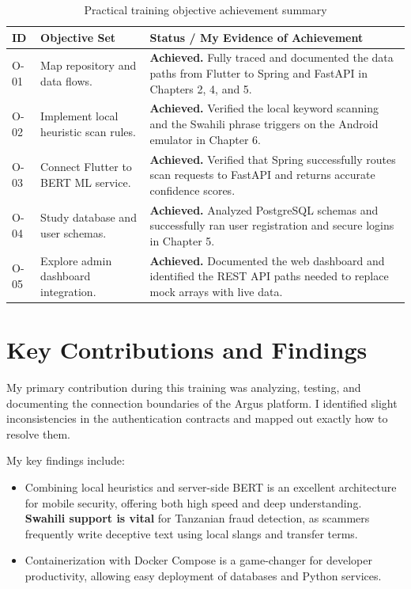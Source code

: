 \begin{table}[htbp]
  \centering
  \caption{Practical training objective achievement summary}
  \label{tab:objective-achievement}
  \begin{tabularx}{\textwidth}{l p{} X}
    \toprule
    \textbf{ID} & \textbf{Objective Set} & \textbf{Status / My Evidence of Achievement}\\
    \midrule
    O-01 & Map repository and data flows. & \textbf{Achieved.} Fully traced and documented the data paths from Flutter to Spring and FastAPI in Chapters 2, 4, and 5.\\
    O-02 & Implement local heuristic scan rules. & \textbf{Achieved.} Verified the local keyword scanning and the Swahili phrase triggers on the Android emulator in Chapter 6.\\
    O-03 & Connect Flutter to BERT ML service. & \textbf{Achieved.} Verified that Spring successfully routes scan requests to FastAPI and returns accurate confidence scores.\\
    O-04 & Study database and user schemas. & \textbf{Achieved.} Analyzed PostgreSQL schemas and successfully ran user registration and secure logins in Chapter 5.\\
    O-05 & Explore admin dashboard integration. & \textbf{Achieved.} Documented the web dashboard and identified the REST API paths needed to replace mock arrays with live data.\\
    \bottomrule
  \end{tabularx}
\end{table}

\section{Key Contributions and Findings}
My primary contribution during this training was analyzing, testing, and documenting the connection boundaries of the Argus platform. I identified slight inconsistencies in the authentication contracts and mapped out exactly how to resolve them. 

My key findings include:
\begin{itemize}
  \item Combining local heuristics and server-side BERT is an excellent architecture for mobile security, offering both high speed and deep understanding.
  \textbf{Swahili support is vital} for Tanzanian fraud detection, as scammers frequently write deceptive text using local slangs and transfer terms.
  \item Containerization with Docker Compose is a game-changer for developer productivity, allowing easy deployment of databases and Python services.
\end{itemize}

